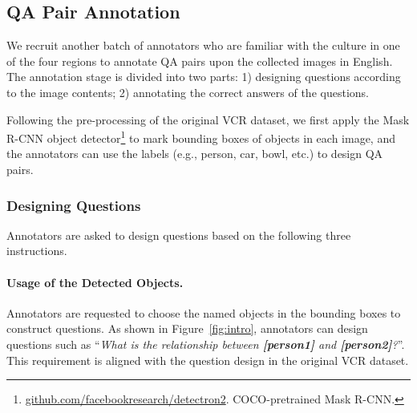 \documentclass[11pt]{article}
\begin{document}
\subsection{QA Pair Annotation}
\label{sec:qa_annotation}
We recruit another batch of annotators who are familiar with the culture in one of the four regions to annotate QA pairs upon the collected images in English. The annotation stage is divided into two parts: 1) designing questions according to the image contents; 2) annotating the correct answers of the questions.

Following the pre-processing of the original VCR dataset, we first apply the Mask R-CNN object detector\footnote{\url{github.com/facebookresearch/detectron2}. COCO-pretrained Mask R-CNN.} to mark bounding boxes of objects in each image, and the annotators can use the labels (e.g., person, car, bowl, etc.) to design QA pairs.
\subsubsection{Designing Questions}
\label{sec:question_design}
Annotators are asked to design questions based on the following three instructions.
\paragraph{Usage of the Detected Objects.}
Annotators are requested to choose the named objects in the bounding boxes to construct questions. As shown in Figure~\ref{fig:intro}, annotators can design questions such as ``\textit{What is the relationship between \colorbox[rgb]{ .891,  .891,  .891}{\textbf{[person1]}} and \colorbox[rgb]{ .891,  .891,  .891}{\textbf{[person2]}}?}''. This requirement is aligned with the question design in the original VCR dataset.
\end{document}
